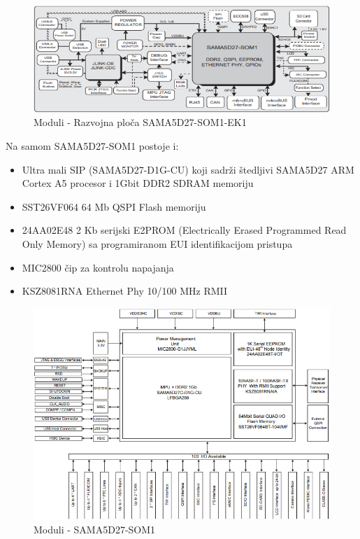 \documentclass[a4paper,12pt, master]{etf}
\begin{document}
	\begin{figure}[htb]
			\centering
			\includegraphics[scale=.7]{../pic/hw_modules.png}
			\caption{Moduli - Razvojna plo\v{c}a SAMA5D27-SOM1-EK1}
			\label{fig:hw_modules}
	\end{figure}

	Na samom SAMA5D27-SOM1 postoje i:
	\begin{itemize}
		\item Ultra mali SIP (SAMA5D27-D1G-CU) koji sadr\v{z}i \v{s}tedljivi
		SAMA5D27 ARM Cortex A5 procesor i 1Gbit DDR2 SDRAM memoriju
		\item SST26VF064 64 Mb QSPI Flash memoriju
		\item 24AA02E48 2 Kb serijski E2PROM (Electrically Erased Programmed
		Read Only Memory) sa programiranom EUI identifikacijom pristupa
        \item MIC2800 \v{c}ip za kontrolu napajanja
		\item KSZ8081RNA Ethernet Phy 10/100 MHz RMII
	\end{itemize}

	\begin{figure}[htb]
			\centering
			\includegraphics[scale=.5]{../pic/hw_som_modules.PNG}
			\caption{Moduli - SAMA5D27-SOM1}
			\label{fig:hw_som_modules}
	\end{figure}
\end{document}
